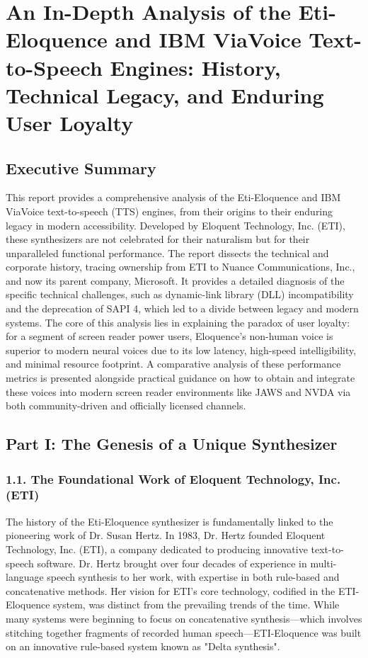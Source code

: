 \chapter{An In-Depth Analysis of the Eti-Eloquence and IBM ViaVoice Text-to-Speech Engines: History, Technical Legacy, and Enduring User Loyalty}
\section{Executive Summary}
This report provides a comprehensive analysis of the Eti-Eloquence and
IBM ViaVoice text-to-speech (TTS) engines, from their origins to their
enduring legacy in modern accessibility. Developed by Eloquent
Technology, Inc. (ETI), these synthesizers are not celebrated for their
naturalism but for their unparalleled functional performance. The report
dissects the technical and corporate history, tracing ownership from ETI
to Nuance Communications, Inc., and now its parent company, Microsoft.
It provides a detailed diagnosis of the specific technical challenges,
such as dynamic-link library (DLL) incompatibility and the deprecation
of SAPI 4, which led to a divide between legacy and modern systems. The
core of this analysis lies in explaining the paradox of user loyalty:
for a segment of screen reader power users, Eloquence's non-human voice
is superior to modern neural voices due to its low latency, high-speed
intelligibility, and minimal resource footprint. A comparative analysis
of these performance metrics is presented alongside practical guidance
on how to obtain and integrate these voices into modern screen reader
environments like JAWS and NVDA via both community-driven and officially
licensed channels.

\section{Part I: The Genesis of a Unique Synthesizer}
\subsection{1.1. The Foundational Work of Eloquent Technology, Inc. (ETI)}
The history of the Eti-Eloquence synthesizer is fundamentally linked to
the pioneering work of Dr. Susan Hertz. In 1983, Dr. Hertz founded
Eloquent Technology, Inc. (ETI), a company dedicated to producing
innovative text-to-speech software.\supercite{1} Dr. Hertz brought over four
decades of experience in multi-language speech synthesis to her work,
with expertise in both rule-based and concatenative methods.\supercite{1} Her
vision for ETI's core technology, codified in the ETI-Eloquence system,
was distinct from the prevailing trends of the time. While many systems
were beginning to focus on concatenative synthesis---which involves
stitching together fragments of recorded human speech---ETI-Eloquence
was built on an innovative rule-based system known as "Delta
synthesis".\supercite{2}

